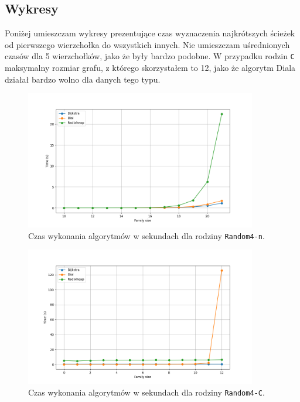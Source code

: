\documentclass{article}
\begin{document}
\subsection{Wykresy}
Poniżej umieszczam wykresy prezentujące czas wyznaczenia najkrótszych ścieżek od pierwszego wierzchołka do wszystkich innych.
Nie umieszczam uśrednionych czasów dla 5 wierzchołków, jako że były bardzo podobne.
W przypadku rodzin \texttt{C} maksymalny rozmiar grafu, z którego skorzystałem to 12, jako że algorytm Diala działał bardzo wolno dla danych tego typu.

\begin{figure}[H]
    \centering
    \includegraphics[width=0.9\textwidth]{Random4-n.png}
    \caption{Czas wykonania algorytmów w sekundach dla rodziny \texttt{Random4-n}.}
\end{figure}

\begin{figure}[H]
    \centering
    \includegraphics[width=0.9\textwidth]{Random4-C.png}
    \caption{Czas wykonania algorytmów w sekundach dla rodziny \texttt{Random4-C}.}
\end{figure}
\end{document}

